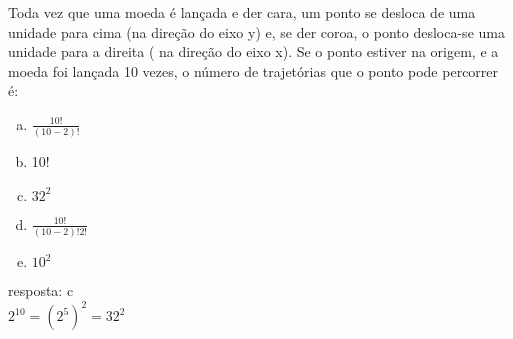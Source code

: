 \begin{ex}
 Toda vez que uma moeda é lançada e der cara, um ponto se desloca de uma unidade para cima (na direção do eixo y) e, se der coroa, o ponto desloca-se uma unidade para a direita ( na direção do eixo x). Se o ponto estiver na origem, e a moeda foi lançada 10 vezes, o número de trajetórias que o ponto pode percorrer é:
    \begin{enumerate}[(a)]
    \item $\frac{10!}{(10 - 2 )!}$
    \item 10!
    \item $32^2$
    \item $\frac{10!}{(10-2)!2!}$
    \item $10^2$
    \end{enumerate}
      \begin{sol}
        resposta: c \\
        $2^{10}=(2^5)^2=32^2$
      \end{sol}
\end{ex}